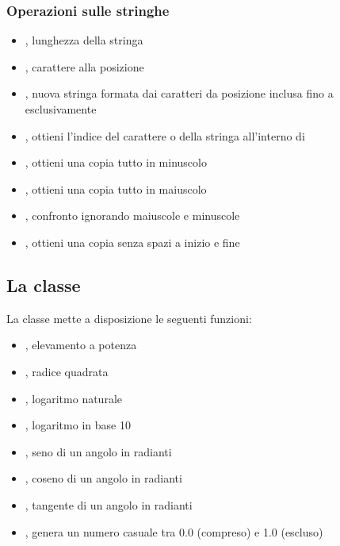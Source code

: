 \documentclass[../main.tex]{subfiles}
\begin{document}
\subsubsection{Operazioni sulle stringhe}
\begin{itemize}
    \item {}, lunghezza della stringa
    \item {}, carattere alla posizione 
    \item {}, nuova stringa formata dai caratteri da posizione  inclusa fino a  esclusivamente
    \item {}, ottieni l'indice del carattere o della stringa all'interno di 
    \item {}, ottieni una copia tutto in minuscolo
    \item {}, ottieni una copia tutto in maiuscolo
    \item {}, confronto ignorando maiuscole e minuscole
    \item {}, ottieni una copia senza spazi a inizio  e fine
\end{itemize}

\pagebreak
\subsection{La classe }
La classe  mette a disposizione le seguenti funzioni:
\begin{itemize}
    \item {}, elevamento a potenza
    \item {}, radice quadrata
    \item {}, logaritmo naturale
    \item {}, logaritmo in base 10
    \item {}, seno di un angolo in radianti
    \item {}, coseno di un angolo in radianti
    \item {}, tangente di un angolo in radianti
    \item {}, genera un numero casuale tra 0.0 (compreso) e 1.0 (escluso)
\end{itemize}
\end{document}
